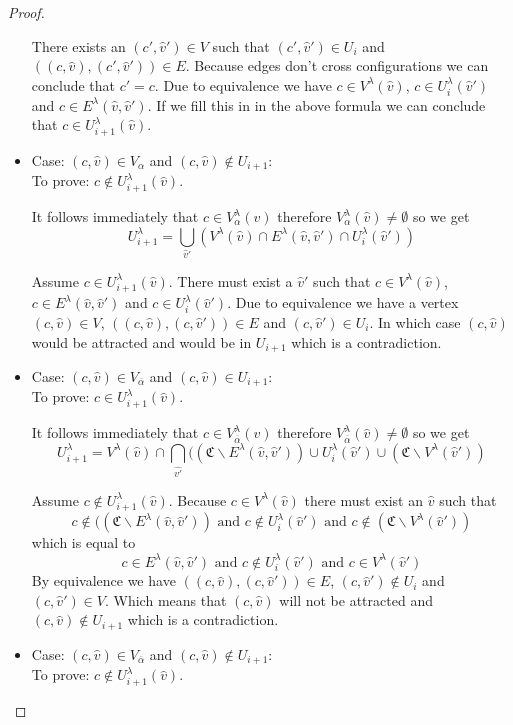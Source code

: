 \begin{lemma}
\begin{proof}
\begin{itemize}
			There exists an $(c',\hat{v}') \in V$ such that $(c',\hat{v}') \in U_i$ and $((c,\hat{v}),(c',\hat{v}')) \in E$. Because edges don't cross configurations we can conclude that $c' = c$. Due to equivalence we have $c \in V^\lambda(\hat{v})$, $c \in U^\lambda_i(\hat{v}')$ and $c \in E^\lambda(\hat{v},\hat{v}')$. If we fill this in in the above formula we can conclude that $c \in U^\lambda_{i+1}(\hat{v})$.
			\item Case: $(c, \hat{v}) \in V_{\alpha}$ and $(c,\hat{v}) \notin U_{i+1}$:\\
			To prove: $c \notin U^\lambda_{i+1}(\hat{v})$.
			
			
			It follows immediately that $c \in V^\lambda_{\alpha}(\hat{v})$ therefore $V^\lambda_{\alpha}(\hat{v}) \neq \emptyset$ so we get
			\[ U^\lambda_{i+1} =\bigcup_{\hat{v}'} (V^\lambda(\hat{v}) \cap E^\lambda(\hat{v},\hat{v}') \cap U^\lambda_i(\hat{v}')) \]
			
			Assume $c \in U^\lambda_{i+1}(\hat{v})$. There must exist a $\hat{v}'$ such that $c \in V^\lambda(\hat{v})$, $c \in E^\lambda(\hat{v},\hat{v}')$ and $c \in U^\lambda_i(\hat{v}')$. Due to equivalence we have a vertex $(c,\hat{v}) \in V$, $((c,\hat{v}),(c,\hat{v}')) \in E$ and $(c,\hat{v}') \in U_i$. In which case $(c,\hat{v})$ would be attracted and would be in $U_{i+1}$ which is a contradiction.
			\item Case: $(c, \hat{v}) \in V_{\overline{\alpha}}$ and $(c,\hat{v}) \in U_{i+1}$:\\
			To prove: $c \in U^\lambda_{i+1}(\hat{v})$.
			
			
			It follows immediately that $c \in V^\lambda_{\overline{\alpha}}(\hat{v})$ therefore $V^\lambda_{\overline{\alpha}}(\hat{v}) \neq \emptyset$ so we get
			\[ U^\lambda_{i+1} =V^\lambda(\hat{v}) \cap \bigcap_{\hat{v'}}((\mathfrak{C} \backslash E^\lambda(\hat{v},\hat{v}')) \cup U^\lambda_i(\hat{v}') \cup (\mathfrak{C}\backslash V^\lambda(\hat{v}')) \]
			
			Assume $c \notin U^\lambda_{i+1}(\hat{v})$. Because $c \in V^\lambda(\hat{v})$ there must exist an $\hat{v}$ such that
			\[ c \notin ((\mathfrak{C} \backslash E^\lambda(\hat{v},\hat{v}')) \text{ and } c \notin U^\lambda_i(\hat{v}') \text{ and } c \notin (\mathfrak{C}\backslash V^\lambda(\hat{v}')) \]
			which is equal to
			\[ c \in E^\lambda(\hat{v},\hat{v}') \text{ and } c \notin U^\lambda_i(\hat{v}') \text{ and } c \in V^\lambda(\hat{v}') \]
			By equivalence we have $((c,\hat{v}),(c,\hat{v}')) \in E$, $(c,\hat{v}') \notin U_i$ and $(c,\hat{v}') \in V$. Which means that $(c,\hat{v})$ will not be attracted and $(c,\hat{v}) \notin U_{i+1}$ which is a contradiction.
			\item Case: $(c, \hat{v}) \in V_{\overline{\alpha}}$ and $(c,\hat{v}) \notin U_{i+1}$:\\
			To prove: $c \notin U^\lambda_{i+1}(\hat{v})$.
			

\end{itemize}
\end{proof}
\end{lemma}
